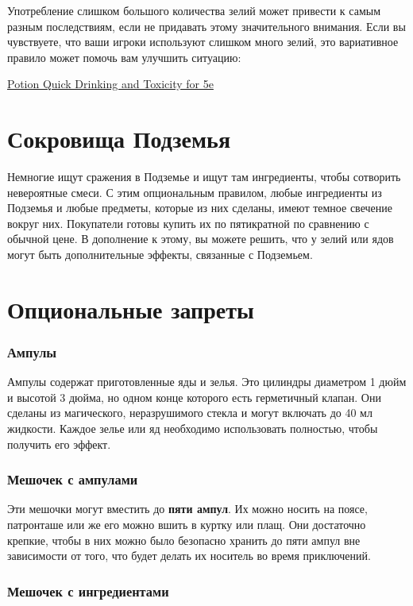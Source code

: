 \documentclass[a4paper, 9pt, twocolumn]{book}
\begin{document}
	Употребление слишком большого количества зелий может привести к самым разным последствиям, если не придавать этому значительного внимания. Если вы чувствуете, что ваши игроки используют слишком много зелий, это вариативное правило может помочь вам улучшить ситуацию: 
	
	\href{https://homebrewery.naturalcrit.com/share/n1MAVZSD}{Potion Quick Drinking and Toxicity for 5e}	
	
	\section{Сокровища Подземья}
	
	Немногие ищут сражения в Подземье и ищут там ингредиенты, чтобы сотворить невероятные смеси. С этим опциональным правилом, любые ингредиенты из Подземья и любые предметы, которые из них сделаны, имеют темное свечение вокруг них. Покупатели готовы купить их по пятикратной по сравнению с обычной цене. В дополнение к этому, вы можете решить, что у зелий или ядов могут быть дополнительные эффекты, связанные с Подземьем.
	
	\section{Опциональные запреты}
	
	\subsubsection{Ампулы}
	
	Ампулы содержат приготовленные яды и зелья. Это цилиндры диаметром 1 дюйм и высотой 3 дюйма, но одном конце которого есть герметичный клапан. Они сделаны из магического, неразрушимого стекла и могут включать до 40 мл жидкости. Каждое зелье или яд необходимо использовать полностью, чтобы получить его эффект.
	
	\subsubsection{Мешочек с ампулами}
	
	Эти мешочки могут вместить до \textbf{пяти ампул}. Их можно носить на поясе, патронташе или же его можно вшить в куртку или плащ. Они достаточно крепкие, чтобы в них можно было безопасно хранить до пяти ампул вне зависимости от того, что будет делать их носитель во время приключений.
	
	\subsubsection{Мешочек с ингредиентами}
	
\end{document}
